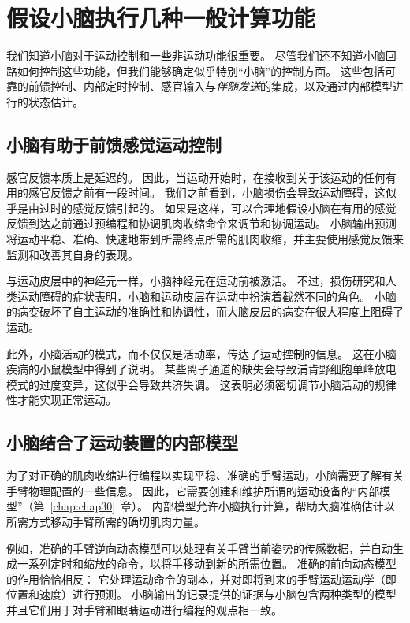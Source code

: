 \section{假设小脑执行几种一般计算功能}

我们知道小脑对于运动控制和一些非运动功能很重要。
尽管我们还不知道小脑回路如何控制这些功能，但我们能够确定似乎特别“小脑”的控制方面。
这些包括可靠的前馈控制、内部定时控制、感官输入与\textit{伴随发送}的集成，以及通过内部模型进行的状态估计。



\subsection{小脑有助于前馈感觉运动控制}

感官反馈本质上是延迟的。
因此，当运动开始时，在接收到关于该运动的任何有用的感官反馈之前有一段时间。
我们之前看到，小脑损伤会导致运动障碍，这似乎是由过时的感觉反馈引起的。
如果是这样，可以合理地假设小脑在有用的感觉反馈到达之前通过预编程和协调肌肉收缩命令来调节和协调运动。
小脑输出预测将运动平稳、准确、快速地带到所需终点所需的肌肉收缩，并主要使用感觉反馈来监测和改善其自身的表现。


与运动皮层中的神经元一样，小脑神经元在运动前被激活。
不过，损伤研究和人类运动障碍的症状表明，小脑和运动皮层在运动中扮演着截然不同的角色。
小脑的病变破坏了自主运动的准确性和协调性，而大脑皮层的病变在很大程度上阻碍了运动。


此外，小脑活动的模式，而不仅仅是活动率，传达了运动控制的信息。
这在小脑疾病的小鼠模型中得到了说明。
某些离子通道的缺失会导致浦肯野细胞单峰放电模式的过度变异，这似乎会导致共济失调。
这表明必须密切调节小脑活动的规律性才能实现正常运动。



\subsection{小脑结合了运动装置的内部模型}

为了对正确的肌肉收缩进行编程以实现平稳、准确的手臂运动，小脑需要了解有关手臂物理配置的一些信息。
因此，它需要创建和维护所谓的运动设备的“内部模型”（第~\ref{chap:chap30}~章）。
内部模型允许小脑执行计算，帮助大脑准确估计以所需方式移动手臂所需的确切肌肉力量。


例如，准确的手臂逆向动态模型可以处理有关手臂当前姿势的传感数据，并自动生成一系列定时和缩放的命令，以将手移动到新的所需位置。
准确的前向动态模型的作用恰恰相反：
它处理运动命令的副本，并对即将到来的手臂运动运动学（即位置和速度）进行预测。
小脑输出的记录提供的证据与小脑包含两种类型的模型并且它们用于对手臂和眼睛运动进行编程的观点相一致。


